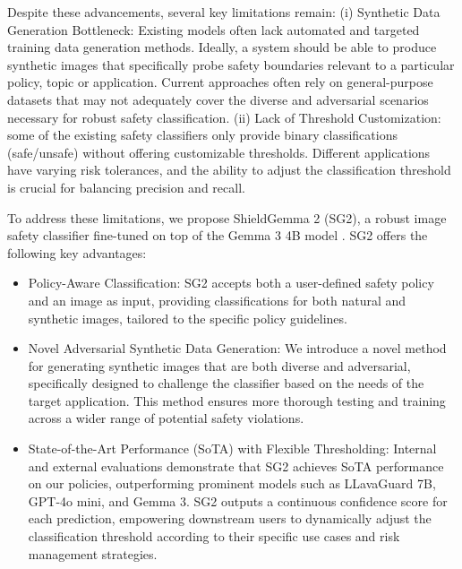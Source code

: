 Despite these advancements, several key limitations remain: (i) Synthetic Data Generation Bottleneck: Existing models often lack automated and targeted training data generation methods. Ideally, a system should be able to produce synthetic images that specifically probe safety boundaries relevant to a particular policy, topic or application. Current approaches often rely on general-purpose datasets that may not adequately cover the diverse and adversarial scenarios necessary for robust safety classification. (ii) Lack of Threshold Customization: some of the existing safety classifiers only provide binary classifications (safe/unsafe) without offering customizable thresholds. Different applications have varying risk tolerances, and the ability to adjust the classification threshold is crucial for balancing precision and recall. 

To address these limitations, we propose ShieldGemma 2 (SG2), a robust image safety classifier fine-tuned on top of the Gemma 3 4B model \cite{gemma_2025}. SG2 offers the following key advantages: 
\begin{itemize}[leftmargin=10pt]
    \item Policy-Aware Classification: SG2 accepts both a user-defined safety policy and an image as input, providing classifications for both natural and synthetic images, tailored to the specific policy guidelines.
    \item Novel Adversarial Synthetic Data Generation: We introduce a novel method for generating synthetic images that are both diverse and adversarial, specifically designed to challenge the classifier based on the needs of the target application. This method ensures more thorough testing and training across a wider range of potential safety violations.
    \item State-of-the-Art Performance (SoTA) with Flexible Thresholding: Internal and external evaluations demonstrate that SG2 achieves SoTA performance on our policies, outperforming prominent models such as LLavaGuard 7B, GPT-4o mini,  and Gemma 3. SG2 outputs a continuous confidence score for each prediction, empowering downstream users to dynamically adjust the classification threshold according to their specific use cases and risk management strategies.
\end{itemize}
